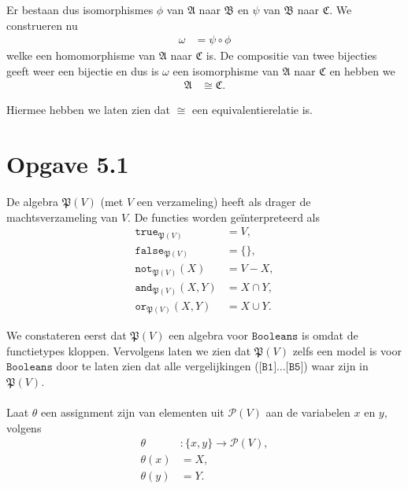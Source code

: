 \documentclass[a4paper,11pt]{article}
\begin{document}
\begin{description}
Er bestaan dus isomorphismes $\phi$ van $\mathfrak{A}$ naar $\mathfrak{B}$ en
$\psi$ van $\mathfrak{B}$ naar $\mathfrak{C}$. We construeren nu
\begin{align*}
\omega &= \psi \circ \phi
\end{align*}
welke een homomorphisme van $\mathfrak{A}$ naar $\mathfrak{C}$ is. De
compositie van twee bijecties geeft weer een bijectie en dus is $\omega$ een
isomorphisme van $\mathfrak{A}$ naar $\mathfrak{C}$ en hebben we
\begin{align*}
\mathfrak{A} &\cong \mathfrak{C}.
\end{align*}

Hiermee hebben we laten zien dat $\cong$ een equivalentierelatie is.\\[2em]

\end{description}


\section*{Opgave 5.1}

De algebra $\mathfrak{P}(V)$ (met $V$ een verzameling) heeft als drager de
machtsverzameling van $V$. De functies worden ge\"interpreteerd als
\begin{align*}
\texttt{true}_{\mathfrak{P}(V)}     &= V , \\
\texttt{false}_{\mathfrak{P}(V)}    &= \{\} , \\
\texttt{not}_{\mathfrak{P}(V)}(X)   &= V - X , \\
\texttt{and}_{\mathfrak{P}(V)}(X,Y) &= X \cap Y , \\
\texttt{or}_{\mathfrak{P}(V)}(X,Y)  &= X \cup Y .
\end{align*}

We constateren eerst dat $\mathfrak{P}(V)$ een algebra voor
$\texttt{Booleans}$ is omdat de functietypes kloppen. Vervolgens laten we zien
dat $\mathfrak{P}(V)$ zelfs een model is voor $\texttt{Booleans}$ door te
laten zien dat alle vergelijkingen ($\texttt{[B1]} \ldots \texttt{[B5]}$) waar
zijn in $\mathfrak{P}(V)$.

\paragraph{}

Laat $\theta$ een assignment zijn van elementen uit $\mathcal{P}(V)$ aan
de variabelen $x$ en $y$, volgens
\begin{align*}
\theta    &: \{x,y\} \rightarrow \mathcal{P}(V), \\
\theta(x) &= X, \\
\theta(y) &= Y.
\end{align*}
\end{document}
